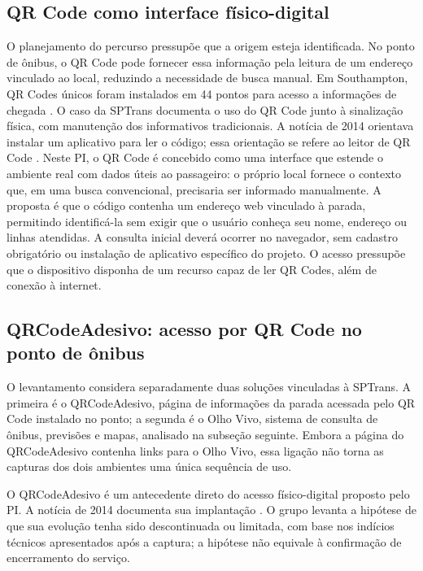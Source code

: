 \documentclass[12pt,oneside,a4paper,brazil]{abntex2}
\begin{document}
\subsection{QR Code como interface físico-digital}
O planejamento do percurso pressupõe que a origem esteja identificada. No ponto de ônibus, o QR Code pode fornecer essa informação pela leitura de um endereço vinculado ao local, reduzindo a necessidade de busca manual. Em Southampton, QR Codes únicos foram instalados em 44 pontos para acesso a informações de chegada \citep{southampton}. O caso da SPTrans documenta o uso do QR Code junto à sinalização física, com manutenção dos informativos tradicionais. A notícia de 2014 orientava instalar um aplicativo para ler o código; essa orientação se refere ao leitor de QR Code \citep{qrsptrans2014}. Neste PI, o QR Code é concebido como uma interface que estende o ambiente real com dados úteis ao passageiro: o próprio local fornece o contexto que, em uma busca convencional, precisaria ser informado manualmente. A proposta é que o código contenha um endereço web vinculado à parada, permitindo identificá-la sem exigir que o usuário conheça seu nome, endereço ou linhas atendidas. A consulta inicial deverá ocorrer no navegador, sem cadastro obrigatório ou instalação de aplicativo específico do projeto. O acesso pressupõe que o dispositivo disponha de um recurso capaz de ler QR Codes, além de conexão à internet.

\clearpage
\subsection{QRCodeAdesivo: acesso por QR Code no ponto de ônibus}
\label{sec:analise-qrcodeadesivo}
O levantamento considera separadamente duas soluções vinculadas à SPTrans. A primeira é o QRCodeAdesivo, página de informações da parada acessada pelo QR Code instalado no ponto; a segunda é o Olho Vivo, sistema de consulta de ônibus, previsões e mapas, analisado na subseção seguinte. Embora a página do QRCodeAdesivo contenha links para o Olho Vivo, essa ligação não torna as capturas dos dois ambientes uma única sequência de uso.

O QRCodeAdesivo é um antecedente direto do acesso físico-digital proposto pelo PI. A notícia de 2014 documenta sua implantação \citep{qrsptrans2014}. O grupo levanta a hipótese de que sua evolução tenha sido descontinuada ou limitada, com base nos indícios técnicos apresentados após a captura; a hipótese não equivale à confirmação de encerramento do serviço.
\end{document}
